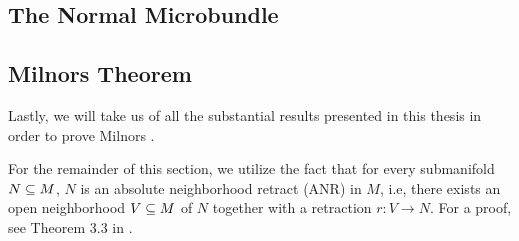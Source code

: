 \subsection*{The Normal Microbundle}\label{section::normal}


\subsection*{Milnors Theorem}\label{section::milnor}
\begin{myparagraph}
Lastly, we will take us of all the substantial
results presented in this thesis in order to prove Milnors .
\end{myparagraph}

\begin{myparagraph}
For the remainder of this section,
we utilize the fact that for every submanifold $N \subseteq{} M$,
$N$ is an absolute neighborhood retract (ANR) in $M$,
i.e, there exists an open neighborhood $V \subseteq{} M$ of $N$
together with a retraction $r: V \to N$.
For a proof, see Theorem 3.3 in \cite{hanner}.

\end{myparagraph}

